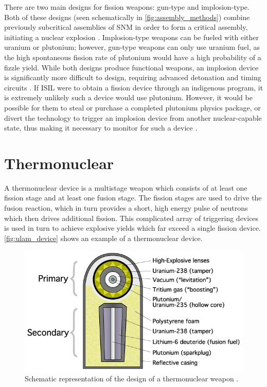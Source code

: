 \documentclass{report}
\begin{document}
There are two main designs for fission weapons:  gun-type and  implosion-type. Both of these designs (seen schematically in \autoref{fig:assembly_methods}) combine previously subcritical assemblies of SNM in order to form a critical assembly, initiating a nuclear explosion \cite{Serber1992}. Implosion-type weapons can be fueled with either uranium or plutonium; however,  gun-type weapons can only use uranium fuel, as the high spontaneous fission rate of  plutonium would have a high probability of a fizzle yield. While both designs produce functional weapons, an implosion device is significantly more difficult to design, requiring advanced detonation and timing circuits \cite{Serber1992}. If ISIL were to obtain a fission device through an indigenous program, it is extremely unlikely such a device would use plutonium. However, it would be possible for them to steal or purchase a completed plutonium physics package, or divert the technology to trigger an implosion device from another nuclear-capable state, thus making it necessary to monitor for such a device \cite{Moody2014}.








\section{Thermonuclear}



A thermonuclear device is a multistage weapon which consists of at least one fission stage and at least one fusion stage. The fission stages are used to drive the fusion reaction, which in turn provides a short, high energy pulse of neutrons which then drives additional fission. This complicated array of triggering devices is used in turn to achieve explosive yields which far exceed a single fission device. \autoref{fig:ulam_device} shows an example of a thermonuclear device.

\begin{figure}
  \centering
  \includegraphics[scale=0.45]{./figures/Ulam_device.png}
  \caption{Schematic representation of the design of a thermonuclear weapon \cite{WikimediaCommons2005}.}
  \label{fig:ulam_device}
\end{figure}
\end{document}
